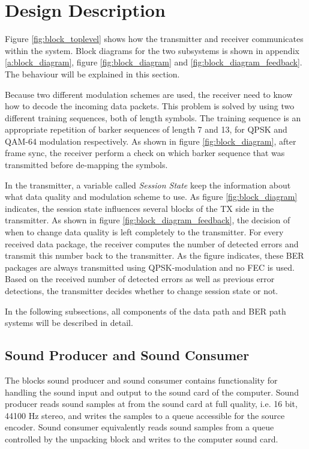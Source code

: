 \section{Design Description}
\label{sec:design_description}
Figure \ref{fig:block_toplevel} shows how the transmitter and receiver communicates within the system. Block diagrams for the two subsystems is shown in appendix \ref{a:block_diagram}, figure \ref{fig:block_diagram} and \ref{fig:block_diagram_feedback}. The behaviour will be explained in this section. 

Because two different modulation schemes are used, the receiver need to know how to decode the incoming data packets. This problem is solved by using two different training sequences, both of length \barkerSymbols symbols. The training sequence is an appropriate repetition of barker sequences of length 7 and 13, for QPSK and QAM-64 modulation respectively. As shown in figure \ref{fig:block_diagram}, after frame sync, the receiver perform a check on which barker sequence that was transmitted before de-mapping the symbols. 

In the transmitter, a variable called \textit{Session State} keep the information about what data quality and modulation scheme to use. As figure \ref{fig:block_diagram} indicates, the session state influences several blocks of the TX side in the transmitter. As shown in figure \ref{fig:block_diagram_feedback}, the decision of when to change data quality is left completely to the transmitter. For every received data package, the receiver computes the number of detected errors and transmit this number back to the transmitter. As the figure indicates, these BER packages are always transmitted using QPSK-modulation and no FEC is used. Based on the received number of detected errors as well as previous error detections, the transmitter decides whether to change session state or not. 

In the following subsections, all components of the data path and BER path systems will be described in detail.   
\subsection{Sound Producer and Sound Consumer}
The blocks sound producer and sound consumer contains functionality for handling the sound input and output to the sound card of the computer. Sound producer reads sound samples at from the sound card at full quality, i.e. 16 bit, 44100 Hz stereo, and writes the samples to a queue accessible for the source encoder. Sound consumer equivalently reads sound samples from a queue controlled by the unpacking block and writes to the computer sound card.

